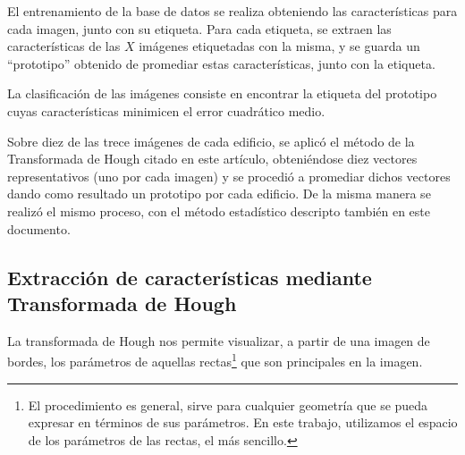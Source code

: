 \documentclass[conference,spanish,a4paper,10pt,oneside,final]{tfmpd}
\begin{document}
El entrenamiento de la base de datos se realiza obteniendo las características
para cada imagen, junto con su etiqueta. Para cada etiqueta, se extraen las
características de las $X$ imágenes etiquetadas con la misma, y se guarda un
``prototipo'' obtenido de promediar estas características, junto con la
etiqueta.

La clasificación de las imágenes consiste en encontrar la etiqueta del
prototipo cuyas características minimicen el error cuadrático medio.

Sobre diez de las trece imágenes de cada edificio, se aplicó el método de la Transformada de Hough citado en este artículo, obteniéndose diez vectores representativos (uno por cada imagen) y se procedió a promediar dichos vectores dando como resultado un prototipo por cada edificio. De la misma manera se realizó el mismo proceso, con el método estadístico descripto también en este documento.

%
%
\subsection*{Extracción de características mediante Transformada de Hough}
La transformada de Hough nos permite visualizar, a partir de una imagen de
bordes, los parámetros de aquellas rectas\footnote{El procedimiento es general,
sirve para cualquier geometría que se pueda expresar en términos de sus
parámetros. En este trabajo, utilizamos el espacio de los parámetros de las
rectas, el más sencillo.}
que son principales en la imagen.
\end{document}
